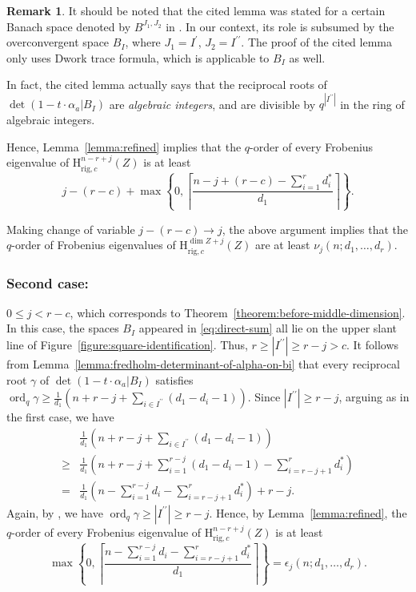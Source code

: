\documentclass{amsart}
\numberwithin{equation}{section}
\theoremstyle{plain}
\theoremstyle{definition}
\newtheorem{remark}[equation]{Remark}
\begin{document}
\begin{remark}
  It should be noted that the cited lemma was stated for a certain Banach space
  denoted by \(B^{J_1,J_2}\) in \cite{wan:poles}. In our context, its role is
  subsumed by the overconvergent space \(B_{I}\), where \(J_1=I^{\prime}\), \(J_2=I^{\prime\prime}\).
  The proof of the cited lemma only uses Dwork trace formula, which is
  applicable to \(B_{I}\) as well.

  In fact, the cited lemma actually says that the reciprocal roots of
  \(\det(1-t\cdot \alpha_{a} | B_I)\) are \emph{algebraic integers}, and are
  divisible by \(q^{|I^{\prime\prime}|}\) in the ring of algebraic integers.
\end{remark}

Hence, Lemma~\ref{lemma:refined} implies that the \(q\)-order of every Frobenius
eigenvalue of
\(\mathrm{H}^{n-r+j}_{\mathrm{rig},c}(Z)\) is at least
\begin{equation}
  \label{eq:first-case}
  j - (r - c) +
  \max\left\{ 0, \left\lceil \frac{n-j+(r-c)-\sum_{i=1}^{r}d^*_i}{d_1} \right\rceil \right\}.
\end{equation}

Making change of variable \(j -(r-c) \to j\), the above argument
implies that the \(q\)-order of Frobenius eigenvalues of
\(\mathrm{H}^{\dim Z+j}_{\mathrm{rig},c}(Z)\) are at least
\(\nu_{j}(n;d_1,\ldots,d_r)\).

\subsubsection*{Second case:} \(0\leq j < r-c\),
which corresponds to Theorem~\ref{theorem:before-middle-dimension}.
In this case, the spaces \(B_I\) appeared in \eqref{eq:direct-sum}
all lie on the upper slant
line of Figure~\ref{figure:square-identification}. Thus,
\(r\geq |I^{\prime\prime}| \geq r-j > c\).
It follows from Lemma~\ref{lemma:fredholm-determinant-of-alpha-on-bi} that
every reciprocal root \(\gamma\) of \(\det(1-t\cdot \alpha_{a}| B_I)\)
satisfies
\(\operatorname{ord}_q\gamma \geq \frac{1}{d_1}\left( n+r-j + \sum_{i\in I^{\prime\prime}} (d_1-d_i-1)\right)\).
Since \(|I^{\prime\prime}| \geq r-j\), arguing as in the first case, we have
\begin{align}
  &\frac{1}{d_1}\left( n+r-j + \sum_{i\in I^{\prime\prime}} (d_1-d_i-1)\right) \nonumber\\
  \geq &\frac{1}{d_1} \left( n+r-j + \sum_{i=1}^{r-j} (d_1-d_i-1) - \sum_{i=r-j+1}^{r}d_{i}^* \right)\nonumber\\
  =    &\frac{1}{d_1} \left( n - \sum_{i=1}^{r-j} d_i - \sum_{i=r-j+1}^{r}d_{i}^{*}\right) + r-j.
         \label{eq:second-case}
\end{align}
Again, by \cite[Lemma~3.1]{wan:poles}, we have
\(\operatorname{ord}_q\gamma \geq |I^{\prime\prime}|\geq r-j\). Hence,
by Lemma~\ref{lemma:refined},
the \(q\)-order of every Frobenius eigenvalue of
\(\mathrm{H}^{n-r+j}_{\mathrm{rig},c}(Z)\) is at least
\begin{equation*}
  \max\left\{ 0, \left\lceil \frac{n-\sum_{i=1}^{r-j}d_i-\sum_{i=r-j+1}^{r}d_i^*}{d_1} \right\rceil \right\} = \epsilon_{j}(n;d_1,\ldots,d_r).
\end{equation*}
\end{document}
